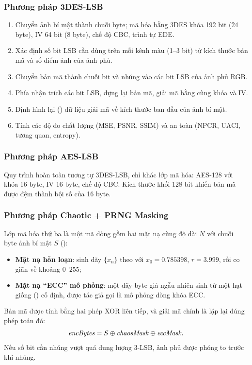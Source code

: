 \subsubsection{Phương pháp 3DES-LSB}

\begin{enumerate}
  \item Chuyển ảnh bí mật thành chuỗi byte; mã hóa bằng 3DES khóa 192 bit (24 byte), IV 64 bit
        (8 byte), chế độ CBC, trình tự EDE.
  \item Xác định số bit LSB cần dùng trên mỗi kênh màu (1--3 bit) từ kích thước bản mã và số điểm
        ảnh của ảnh phủ.
  \item Chuyển bản mã thành chuỗi bit và nhúng vào các bit LSB của ảnh phủ RGB.
  \item Phía nhận trích các bit LSB, dựng lại bản mã, giải mã bằng cùng khóa và IV.
  \item Định hình lại () dữ liệu giải mã về kích thước ban đầu của ảnh bí mật.
  \item Tính các độ đo chất lượng (MSE, PSNR, SSIM) và an toàn (NPCR, UACI, tương quan, entropy).
\end{enumerate}

\subsubsection{Phương pháp AES-LSB}

Quy trình hoàn toàn tương tự 3DES-LSB, chỉ khác lớp mã hóa: AES-128 với khóa 16 byte, IV 16 byte,
chế độ CBC. Kích thước khối 128 bit khiến bản mã được đệm thành bội số của 16 byte.

\subsubsection{Phương pháp Chaotic + PRNG Masking}

Lớp mã hóa thứ ba là một mã dòng gồm hai mặt nạ cùng độ dài $N$ với chuỗi byte ảnh bí mật $S$
():
\begin{itemize}
  \item \textbf{Mặt nạ hỗn loạn}: sinh dãy $\{x_n\}$ theo  với $x_0 = 0.785398$,
        $r = 3.999$, rồi co giãn về khoảng $0$--$255$;
  \item \textbf{Mặt nạ ``ECC'' mô phỏng}: một dãy byte giả ngẫu nhiên sinh từ một hạt giống
        () cố định, được tác giả gọi là mô phỏng dòng khóa ECC.
\end{itemize}
Bản mã được tính bằng hai phép XOR liên tiếp, và giải mã chính là lặp lại đúng phép toán đó:
\begin{equation}
  \mathit{encBytes} = S \oplus \mathit{chaosMask} \oplus \mathit{eccMask}.
  \label{eq:chaotic}
\end{equation}
Nếu số bit cần nhúng vượt quá dung lượng 3-LSB, ảnh phủ được phóng to trước khi nhúng.

